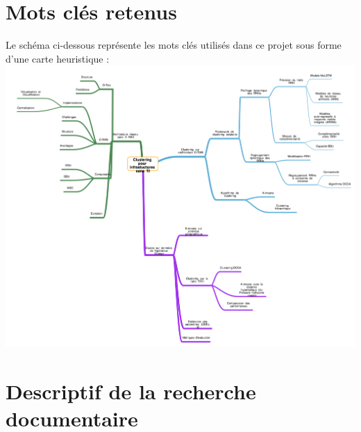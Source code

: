\documentclass{article}
\begin{document}
\section{Mots clés retenus}
\begin{flushleft}
Le schéma ci-dessous représente les mots clés utilisés dans ce projet sous forme d'une carte heuristique :\\
\includegraphics[width=38em]{map.png}\\[1.5cm]
\end{flushleft}
\section{Descriptif de la recherche documentaire}
\end{document}
